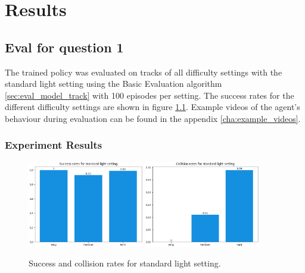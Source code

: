 \chapter{Results}
\label{cha:Results}


\section{Eval for question 1}

The trained policy was evaluated on tracks of all difficulty settings with the standard light setting using the Basic Evaluation algorithm \ref{sec:eval_model_track} with 100 episodes per setting. The success rates for the different difficulty settings are shown in figure \ref{fig:result_success_rates_standard}. Example videos of the agent's behaviour during evaluation can be found in the appendix \ref{cha:example_videos}.

\subsection{Experiment Results}

\begin{figure}
    \centering
    \includegraphics[width=0.45\textwidth]{Bilder/notebook_images/success_trainedHardStandardDistanceRewardEval_standard_success_rates_barplot.png}
    \includegraphics[width=0.45\textwidth]{Bilder/notebook_images/success_trainedHardStandardDistanceRewardEval_standard_collision_rates_barplot.png}
    \caption{Success and collision rates for standard light setting.}
    \label{fig:result_success_rates_standard}
\end{figure}


